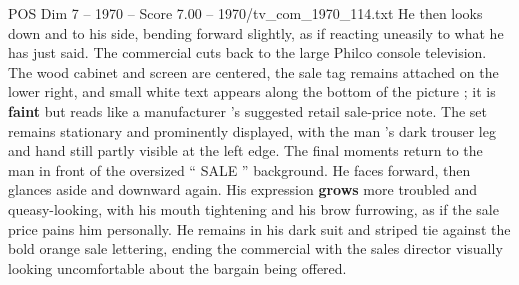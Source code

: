 \begin{textsample}{POS Dim 7 – 1970 – Score 7.00 – 1970/tv\_com\_1970\_114.txt}
He then looks down and to his side, bending forward slightly, as if reacting uneasily to what he has just said.
The commercial cuts back to the large Philco console television.
The wood cabinet and screen are centered, the sale tag remains attached on the lower right, and small white text appears along the bottom of the picture ; it is \textbf{faint} but reads like a manufacturer ’s suggested retail sale-price note.
The set remains stationary and prominently displayed, with the man ’s dark trouser leg and hand still partly visible at the left edge.
The final moments return to the man in front of the oversized “ SALE ” background.
He faces forward, then glances aside and downward again.
His expression \textbf{grows} more troubled and queasy-looking, with his mouth tightening and his brow furrowing, as if the sale price pains him personally.
He remains in his dark suit and striped tie against the bold orange sale lettering, ending the commercial with the sales director visually looking uncomfortable about the bargain being offered.

\end{textsample}
